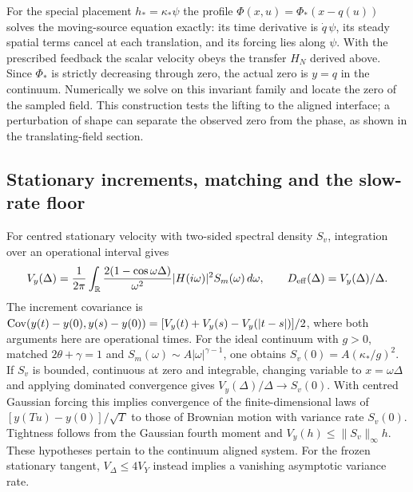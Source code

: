 \documentclass[11pt]{article}
\begin{document}
For the special placement \(h_*=\kappa_*\psi\) the profile
\(\Phi(x,u)=\Phi_*(x-q(u))\) solves the moving-source equation exactly:
its time derivative is \(\dot q\,\psi\), its steady spatial terms cancel at
each translation, and its forcing lies along \(\psi\). With the prescribed
feedback the scalar velocity obeys the transfer \(H_N\) derived above.
Since \(\Phi_*\) is strictly decreasing through zero, the actual zero is
\(y=q\) in the continuum. Numerically we solve on this invariant family
and locate the zero of the sampled field. This construction tests the
lifting to the aligned interface; a perturbation of shape can separate
the observed zero from the phase, as shown in the translating-field section.

\subsection{Stationary increments, matching and the slow-rate floor}
For centred stationary velocity with two-sided spectral density \(S_v\),
integration over an operational interval gives
\begin{equation}
 V_y(\Delta)=\frac{1}{2\pi}\int_{\mathbb R}
       \frac{2(1-\cos\omega\Delta)}{\omega^2}
       |H(i\omega)|^2S_m(\omega)\,d\omega ,
 \qquad D_{\rm eff}(\Delta)=V_y(\Delta)/\Delta .
 \label{eq:actual-root-variance}
\end{equation}
The increment covariance is
\(\mathop{\rm Cov}(y(t)-y(0),y(s)-y(0))
 =[V_y(t)+V_y(s)-V_y(|t-s|)]/2\), where both arguments here are
operational times. For the ideal continuum with \(g>0\), matched
\(2\theta+\gamma=1\) and \(S_m(\omega)\sim A|\omega|^{\gamma-1}\),
one obtains \(S_v(0)=A(\kappa_*/g)^2\). If \(S_v\) is bounded, continuous
at zero and integrable, changing variable to \(x=\omega\Delta\) and
applying dominated convergence gives \(V_y(\Delta)/\Delta\to S_v(0)\).
With centred Gaussian forcing this implies convergence of the
finite-dimensional laws of \([y(Tu)-y(0)]/\sqrt T\) to those of Brownian
motion with variance rate \(S_v(0)\). Tightness follows from the Gaussian
fourth moment and \(V_y(h)\le\|S_v\|_\infty h\). These hypotheses pertain
to the continuum aligned system. For the frozen stationary tangent,
\(V_\Delta\le4V_Y\) instead implies a vanishing asymptotic variance rate.
\end{document}
